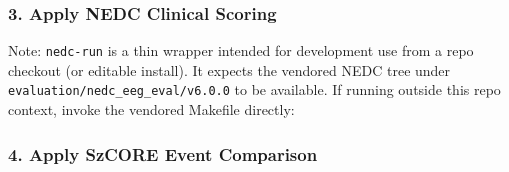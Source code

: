 \hypertarget{apply-nedc-clinical-scoring}{%
\subsubsection{3. Apply NEDC Clinical
Scoring}\label{apply-nedc-clinical-scoring}}

\begin{Shaded}
\begin{Highlighting}[]
 \KeywordTok{\textbackslash{}}
  \KeywordTok{\textbackslash{}}
  \KeywordTok{\textbackslash{}}
  \KeywordTok{\textbackslash{}}

 \KeywordTok{\textbackslash{}}
  \KeywordTok{\textbackslash{}}
  \KeywordTok{\textbackslash{}}
  \KeywordTok{\textbackslash{}}
\end{Highlighting}
\end{Shaded}

Note: \texttt{nedc-run} is a thin wrapper intended for development use
from a repo checkout (or editable install). It expects the vendored NEDC
tree under \texttt{evaluation/nedc\_eeg\_eval/v6.0.0} to be available.
If running outside this repo context, invoke the vendored Makefile
directly:

\begin{Shaded}
\begin{Highlighting}[]
\KeywordTok{\textbackslash{}}
  \KeywordTok{\textbackslash{}}
\end{Highlighting}
\end{Shaded}

\hypertarget{apply-szcore-event-comparison}{%
\subsubsection{4. Apply SzCORE Event
Comparison}\label{apply-szcore-event-comparison}}

